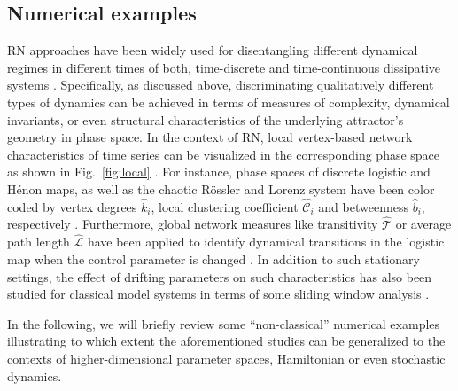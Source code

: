 	\subsection{Numerical examples}\label{sec:numex}
		RN approaches have been widely used for disentangling different dynamical regimes in different times of both, time-discrete and time-continuous dissipative systems \cite{Marwan2009,Donner2010a,Donner2010b,Donner2011,Donner2011b,Zou2010}. Specifically, as discussed above, discriminating qualitatively different types of dynamics can be achieved in terms of measures of complexity, dynamical invariants, or even structural characteristics of the underlying attractor's geometry in phase space. In the context of RN, local vertex-based network characteristics of time series can be visualized in the corresponding phase space as shown in Fig.~\ref{fig:local} \cite{Donner2010a}. For instance, phase spaces of discrete logistic and H\'enon maps, as well as the chaotic R\"ossler and Lorenz system have been color coded by vertex degrees $\hat{k}_i$, local clustering coefficient $\hat{\mathcal{C}}_i$ and betweenness $\hat{b}_i$, respectively \cite{Donner2010a,Donner2010Nolta,Donner2011,Donner2011b}. Furthermore, global network measures like transitivity $\hat{\mathcal{T}}$ or average path length $\hat{\mathcal{L}}$ have been applied to identify dynamical transitions in the logistic map when the control parameter is changed \cite{Marwan2009}. In addition to such stationary settings, the effect of drifting parameters on such characteristics has also been studied for classical model systems in terms of some sliding window analysis \cite{Donges2011}.

In the following, we will briefly review some ``non-classical'' numerical examples illustrating to which extent the aforementioned studies can be generalized to the contexts of higher-dimensional parameter spaces, Hamiltonian or even stochastic dynamics.


